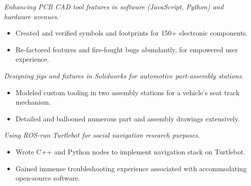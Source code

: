 \documentclass{resume}
\begin{document}
\textit{Enhancing PCB CAD tool features in software (JavaScript, Python) and hardware avenues.}
\begin{itemize}
  \item Created and verified symbols and footprints for 150+ electronic components.
  \item Re-factored features and fire-fought bugs abundantly, for empowered user experience.
\end{itemize}
\begin{comment}
  Adjusted prioritization of design rules in layout constraint manager.
  Fixed incorrect drawing and positioning of constraint violation layout bodies.
  Re-factored event-listening logic for drawing nets in schematic editor.
  Corrected pin manager's oversight in tracking connection mappings.
  Enabled efficient BGA row enumeration during footprint generation.
\end{comment}

\textit{Designing jigs and fixtures in Solidworks for automotive part-assembly stations.}
\begin{itemize}
  \item Modeled custom tooling in two assembly stations for a vehicle's seat track mechanism. %
  \item Detailed and ballooned numerous part and assembly drawings extensively.
\end{itemize}

\textit{Using ROS-run Turtlebot for social navigation research purposes.}
\begin{itemize}
  \item Wrote C++ and Python nodes to implement navigation stack on Turtlebot. 
  \item Gained immense troubleshooting experience associated with accommodating open-source software.
\end{itemize}
\end{document}
